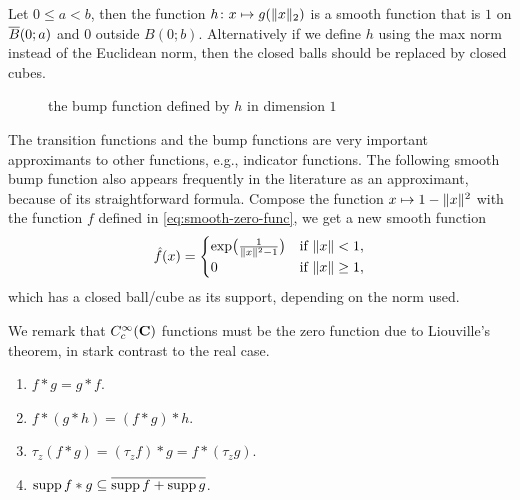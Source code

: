 Let $0\leq a < b$, then the function $h\colon x \mapsto g(\lVert x \rVert_2)$ is a smooth function that is $1$ on $\overline{B}(0;a)$ and $0$ outside ${B}(0;b)$. Alternatively if we define $h$ using the max norm instead of the Euclidean norm, then the closed balls should be replaced by closed cubes.
\begin{figure}
    \centering
    \caption{the bump function defined by $h$ in dimension $1$}
    \label{fig:smooth-bump-func-plt}
\end{figure}

The transition functions and the bump functions are very important approximants to other functions, e.g., indicator functions. The following smooth bump function also appears frequently in the literature as an approximant, because of its straightforward formula. Compose the function $x \mapsto 1 - \lVert x \rVert^2$ with the function $f$ defined in \eqref{eq:smooth-zero-func}, we get a new smooth function \[
    \hat f(x) = \begin{cases}
        \exp\bigl(\frac{1}{\lVert x \rVert^2 - 1}\bigr) & \text{if }\lVert x \rVert < 1, \\
        0 & \text{if }\lVert x \rVert \geq 1,
    \end{cases}
\] which has a closed ball/cube as its support, depending on the norm used.

We remark that $C_c^\infty(\mathbf{C})$ functions must be the zero function due to Liouville's theorem, in stark contrast to the real case.

\begin{prop} \leavevmode
\begin{enumerate} 
    \item $f * g = g * f$.
    \item $f * (g * h) = (f * g) * h$.
    \item $\tau_z (f * g) = (\tau_z f) * g = f * (\tau_z g)$.
    \item $\operatorname{supp} f * g \subseteq \overline{\operatorname{supp} f + \operatorname{supp} g}$.
\end{enumerate}
\end{prop}

